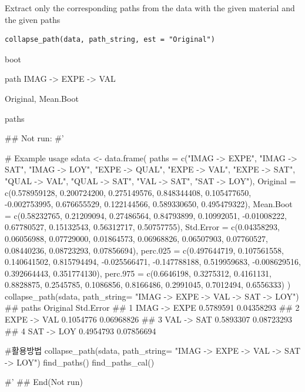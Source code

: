 \documentclass[a4paper]{book}
\begin{document}
%
\begin{Description}
Extract only the corresponding paths from the data with the given material and the given paths
\end{Description}
%
\begin{Usage}
\begin{verbatim}
collapse_path(data, path_string, est = "Original")
\end{verbatim}
\end{Usage}
%
\begin{Arguments}
\begin{ldescription}
\item[\code{data}] boot

\item[\code{path\_string}] path IMAG -> EXPE -> VAL

\item[\code{est}] Original, Mean.Boot
\end{ldescription}
\end{Arguments}
%
\begin{Value}
paths
\end{Value}
%
\begin{Examples}
\begin{ExampleCode}


\#\# Not run: 
#'

# Example usage
sdata <- data.frame(
  paths = c("IMAG -> EXPE", "IMAG -> SAT", "IMAG -> LOY",
   "EXPE -> QUAL", "EXPE -> VAL", "EXPE -> SAT",
            "QUAL -> VAL", "QUAL -> SAT",
            "VAL -> SAT", "SAT -> LOY"),
  Original = c(0.578959128, 0.200724200, 0.275149576,
   0.848344408, 0.105477650, -0.002753995,
               0.676655529, 0.122144566, 0.589330650, 0.495479322),
  Mean.Boot = c(0.58232765, 0.21209094, 0.27486564,
  0.84793899, 0.10992051, -0.01008222,
                0.67780527, 0.15132543, 0.56312717, 0.50757755),
  Std.Error = c(0.04358293, 0.06056988, 0.07729000,
  0.01864573, 0.06968826, 0.06507903,
                0.07760527, 0.08440236, 0.08723293, 0.07856694),
  perc.025 = c(0.497644719, 0.107561558, 0.140641502,
   0.815794494, -0.025566471, -0.147788188,
               0.519959683, -0.008629516, 0.392664443, 0.351774130),
  perc.975 = c(0.6646198, 0.3275312, 0.4161131,
   0.8828875, 0.2545785, 0.1086856,
               0.8166486, 0.2991045, 0.7012494, 0.6556333)
)
collapse_path(sdata, path_string= "IMAG -> EXPE -> VAL -> SAT -> LOY")
## paths  Original  Std.Error
## 1 IMAG -> EXPE 0.5789591 0.04358293
## 2  EXPE -> VAL 0.1054776 0.06968826
## 3   VAL -> SAT 0.5893307 0.08723293
## 4   SAT -> LOY 0.4954793 0.07856694


#활용방법
collapse_path(sdata,
path_string= "IMAG -> EXPE -> VAL -> SAT -> LOY")%
find_paths()%
find_paths_cal()

#' 
## End(Not run)

\end{ExampleCode}
\end{Examples}
\end{document}
